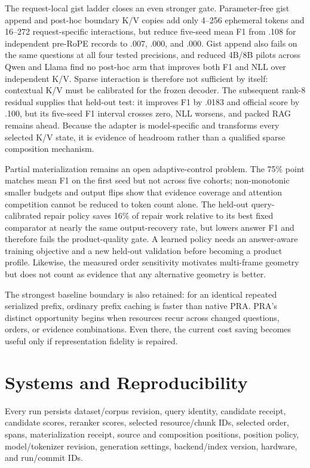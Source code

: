 \documentclass[11pt]{article}
\begin{document}
The request-local gist ladder closes an even stronger gate. Parameter-free gist
append and post-hoc boundary K/V copies add only 4--256 ephemeral tokens and
16--272 request-specific interactions, but reduce five-seed mean F1 from .108
for independent pre-RoPE records to .007, .000, and .000. Gist append also
fails on the same questions at all four tested precisions, and reduced 4B/8B
pilots across Qwen and Llama find no post-hoc arm that improves both F1 and NLL
over independent K/V. Sparse interaction
is therefore not sufficient by itself: contextual K/V must be calibrated for
the frozen decoder. The subsequent rank-8 residual supplies that held-out test:
it improves F1 by .0183 and official score by .100, but its five-seed F1
interval crosses zero, NLL worsens, and packed RAG remains ahead. Because the
adapter is model-specific and transforms every selected K/V state, it is
evidence of headroom rather than a qualified sparse composition mechanism.

Partial materialization remains an open adaptive-control problem. The 75\%
point matches mean F1 on the first seed but not across five cohorts;
non-monotonic smaller budgets and output flips show that evidence coverage and
attention competition cannot be reduced to token count alone. The held-out
query-calibrated repair policy saves 16\% of repair work relative to its best
fixed comparator at nearly the same output-recovery rate, but lowers answer F1
and therefore fails the product-quality gate. A learned policy needs an
answer-aware training objective and a new held-out validation before becoming
a product profile. Likewise, the measured order sensitivity motivates multi-frame
geometry but does not count as evidence that any alternative geometry is
better.

The strongest baseline boundary is also retained: for an identical repeated
serialized prefix, ordinary prefix caching is faster than native PRA. PRA's
distinct opportunity begins when resources recur across changed questions,
orders, or evidence combinations. Even there, the current cost saving becomes
useful only if representation fidelity is repaired.

\section{Systems and Reproducibility}

Every run persists dataset/corpus revision, query identity, candidate receipt, candidate scores, reranker scores, selected resource/chunk IDs, selected order, spans, materialization receipt, source and composition positions, position policy, model/tokenizer revision, generation settings, backend/index version, hardware, and run/commit IDs.
\end{document}
